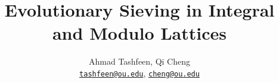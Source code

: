 \author{\texorpdfstring{%
    Ahmad Tashfeen, Qi Cheng\\
    \href{mailto://tashfeen@ou.edu}{\texttt{tashfeen@ou.edu}}, %
    \href{mailto://cheng@ou.edu}{\texttt{cheng@ou.edu}}%
  }{%
    Ahmad Tashfeen, Qi Cheng%
  }
}

\title{%
  Evolutionary Sieving in Integral and Modulo Lattices
}
\address{Computer Science, %
  Gallogly College of Engineering, %
  University of Oklahoma%
}
\usepackage[plain]{algorithm}
\usepackage{blindtext}
\usepackage{etoolbox}
\apptocmd{\sloppy}{\hbadness 10000\relax}{}{}
\geometry{margin=1in}
\graphicspath{{./media/}}

\makeatletter
\renewcommand{\maketitle} {%
  \begin{center}\unskip%
    \textbf{\large\@title}\par%
    \noindent\@author\par%
    \noindent Computer Science, University of Oklahoma%
  \end{center}%
  \box\abstractbox%
}%
\makeatother

